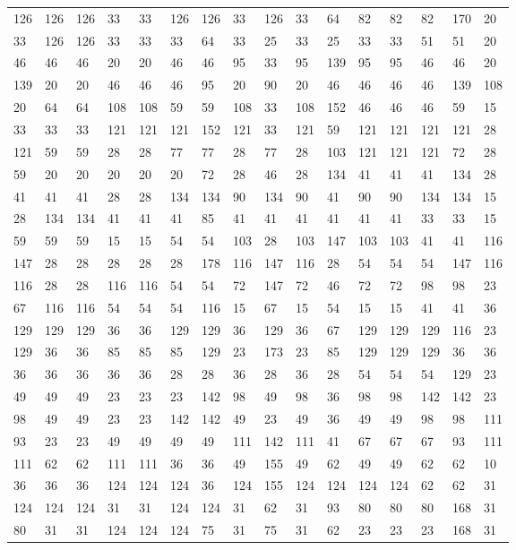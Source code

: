 \begin{longtable}{*{16}{l}}
126& 126& 126& 33& 33& 126& 126& 33& 126& 33& 64& 82& 82& 82& 170& 20\\
33& 126& 126& 33& 33& 33& 64& 33& 25& 33& 25& 33& 33& 51& 51& 20\\
46& 46& 46& 20& 20& 46& 46& 95& 33& 95& 139& 95& 95& 46& 46& 20\\
139& 20& 20& 46& 46& 46& 95& 20& 90& 20& 46& 46& 46& 46& 139& 108\\
20& 64& 64& 108& 108& 59& 59& 108& 33& 108& 152& 46& 46& 46& 59& 15\\
33& 33& 33& 121& 121& 121& 152& 121& 33& 121& 59& 121& 121& 121& 121& 28\\
121& 59& 59& 28& 28& 77& 77& 28& 77& 28& 103& 121& 121& 121& 72& 28\\
59& 20& 20& 20& 20& 20& 72& 28& 46& 28& 134& 41& 41& 41& 134& 28\\
41& 41& 41& 28& 28& 134& 134& 90& 134& 90& 41& 90& 90& 134& 134& 15\\
28& 134& 134& 41& 41& 41& 85& 41& 41& 41& 41& 41& 41& 33& 33& 15\\
59& 59& 59& 15& 15& 54& 54& 103& 28& 103& 147& 103& 103& 41& 41& 116\\
147& 28& 28& 28& 28& 28& 178& 116& 147& 116& 28& 54& 54& 54& 147& 116\\
116& 28& 28& 116& 116& 54& 54& 72& 147& 72& 46& 72& 72& 98& 98& 23\\
67& 116& 116& 54& 54& 54& 116& 15& 67& 15& 54& 15& 15& 41& 41& 36\\
129& 129& 129& 36& 36& 129& 129& 36& 129& 36& 67& 129& 129& 129& 116& 23\\
129& 36& 36& 85& 85& 85& 129& 23& 173& 23& 85& 129& 129& 129& 36& 36\\
36& 36& 36& 36& 36& 28& 28& 36& 28& 36& 28& 54& 54& 54& 129& 23\\
49& 49& 49& 23& 23& 23& 142& 98& 49& 98& 36& 98& 98& 142& 142& 23\\
98& 49& 49& 23& 23& 142& 142& 49& 23& 49& 36& 49& 49& 98& 98& 111\\
93& 23& 23& 49& 49& 49& 49& 111& 142& 111& 41& 67& 67& 67& 93& 111\\
111& 62& 62& 111& 111& 36& 36& 49& 155& 49& 62& 49& 49& 62& 62& 10\\
36& 36& 36& 124& 124& 124& 36& 124& 155& 124& 124& 124& 124& 62& 62& 31\\
124& 124& 124& 31& 31& 124& 124& 31& 62& 31& 93& 80& 80& 80& 168& 31\\
80& 31& 31& 124& 124& 124& 75& 31& 75& 31& 62& 23& 23& 23& 168& 31\\

\end{longtable}

